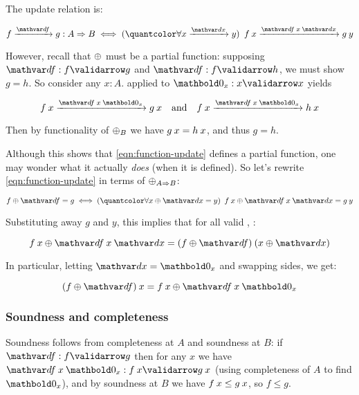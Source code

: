 The update relation is:

\nopagebreak[2]
\begin{equation}\label{eqn:function-update}
  \vld{\df}{f}{g} : \expO A B
  \iff \fa{\vld\dx x y} \vld{\df\<x\<\dx} {f\<x} {g\<y}
\end{equation}

\noindent However, recall that $\mathbin{\oplus}$ must be a partial function: supposing
$\valid\df f g$ and $\valid\df f h$, we must show $g = h$. So consider any $x :
A$.  applied to $\valid{\zero_x} x x$ yields

\nopagebreak[2]
\[ \vld{\df \<x \<\zero_x}{f \<x}{g\<x}
\quad\text{and}\quad \vld{\df \<x \<\zero_x}{f \<x}{h\<x} \]

\noindent
Then by functionality of ${\mathbin{\oplus}}_B$ we have $g\<x = h\<x$, and thus $g = h$.

Although this shows that \cref{eqn:function-update} defines a partial function,
one may wonder what it actually \emph{does} (when it is defined). So let's
rewrite \cref{eqn:function-update} in terms of $\mathbin{\oplus}_{A \Rightarrow B}$:

\nopagebreak[2]
\[ f \upd \df = g \iff \fa{x \upd \dx = y} f\<x \upd \df\<x\<\dx = g\<y \]

\noindent Substituting away $g$ and $y$, this implies that for all valid
\dx, \df:

\nopagebreak[2]
\[
f\<x \upd \df\<x\<\dx = (f \upd \df) \<(x \upd \dx)
\]

\noindent In particular, letting $\dx = \zero_x$ and swapping sides, we get:

\nopagebreak[2]
\[ (f \upd \df) \<x = f\<x \upd \df\<x\<\zero_x \]

\noindent
{}

\subsubsection{Soundness and completeness}

Soundness follows from completeness at $A$ and soundness at $B$: if $\valid\df f
g$ then for any $x$ we have $\valid{\df\<x\<\zero_x}{f\<x}{g\<x}$ (using
completeness of $A$ to find $\zero_x$), and by soundness at $B$ we have $f\<x
\le g\<x$, so $f \le g$.

